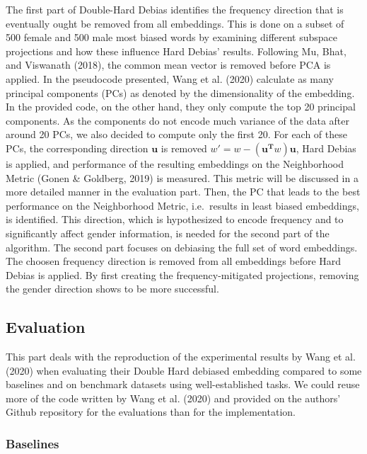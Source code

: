 \documentclass[
  english,
  man,floatsintext]{apa6}
\begin{document}
The first part of Double-Hard Debias identifies the frequency direction that is eventually ought be removed from all embeddings. This is done on a subset of 500 female and 500 male most biased words by examining different subspace projections and how these influence Hard Debias' results. Following Mu, Bhat, and Viswanath (2018), the common mean vector is removed before PCA is applied. In the pseudocode presented, Wang et al. (2020) calculate as many principal components (PCs) as denoted by the dimensionality of the embedding. In the provided code, on the other hand, they only compute the top 20 principal components. As the components do not encode much variance of the data after around 20 PCs, we also decided to compute only the first 20.
For each of these PCs, the corresponding direction \(\mathbf{u}\) is removed \(w' = w - (\mathbf{u^{T}}w)\mathbf{u}\), Hard Debias is applied, and performance of the resulting embeddings on the Neighborhood Metric (Gonen \& Goldberg, 2019) is measured. This metric will be discussed in a more detailed manner in the evaluation part. Then, the PC that leads to the best performance on the Neighborhood Metric, i.e.~results in least biased embeddings, is identified. This direction, which is hypothesized to encode frequency and to significantly affect gender information, is needed for the second part of the algorithm.
The second part focuses on debiasing the full set of word embeddings. The choosen frequency direction is removed from all embeddings before Hard Debias is applied. By first creating the frequency-mitigated projections, removing the gender direction shows to be more successful.

\hypertarget{evaluation}{%
\subsection{Evaluation}\label{evaluation}}

This part deals with the reproduction of the experimental results by Wang et al. (2020) when evaluating their Double Hard debiased embedding compared to some baselines and on benchmark datasets using well-established tasks. We could reuse more of the code written by Wang et al. (2020) and provided on the authors' Github repository for the evaluations than for the implementation.

\hypertarget{baselines}{%
\subsubsection{Baselines}\label{baselines}}
\end{document}
